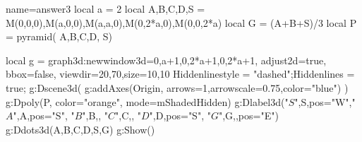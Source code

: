 \documentclass{standalone}
\begin{document}
\begin{luadraw}{name=answer3}
local a = 2
local A,B,C,D,S = M(0,0,0),M(a,0,0),M(a,a,0),M(0,2*a,0),M(0,0,2*a)
local G = (A+B+S)/3
local P = pyramid( {A,B,C,D}, S)

local g = graph3d:new{window3d={0,a+1,0,2*a+1,0,2*a+1}, adjust2d=true, bbox=false, viewdir={20,70},size={10,10}}
Hiddenlinestyle = "dashed";Hiddenlines = true;
g:Dscene3d( g:addAxes(Origin, {arrows=1,arrowscale=0.75,color="blue"}) )
g:Dpoly(P, {color="orange", mode=mShadedHidden})
 g:Dlabel3d("$S$",S,{pos="W"},"$A$",A,{pos="S"}, "$B$",B,{}, "$C$",C,{}, "$D$",D,{pos="S"}, "$G$",G,{},{pos="E"})
g:Ddots3d({A,B,C,D,S,G})
g:Show()
\end{luadraw}
\end{document}
